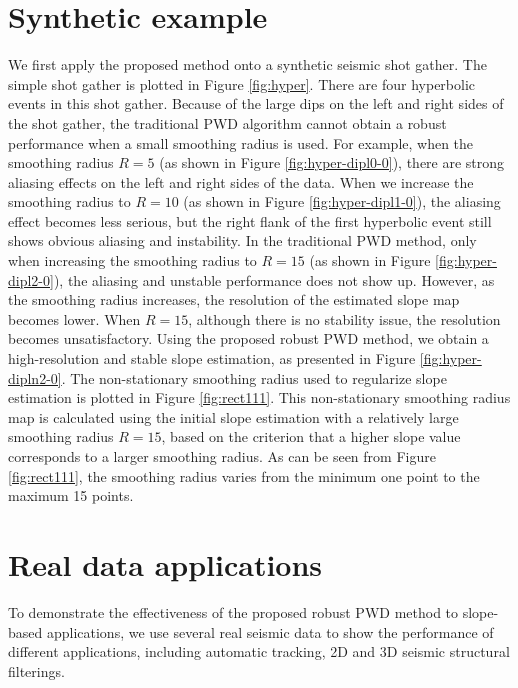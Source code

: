 \section{Synthetic example}
We first apply the proposed method onto a synthetic seismic shot gather. The simple shot gather is plotted in Figure \ref{fig:hyper}. There are four hyperbolic events in this shot gather. Because of the large dips on the left and right sides of the shot gather, the traditional PWD algorithm cannot obtain a robust performance when a small smoothing radius is used. For example, when the smoothing radius $R=5$ (as shown in Figure \ref{fig:hyper-dipl0-0}), there are strong aliasing effects on the left and right sides of the data. When we increase the smoothing radius to $R=10$ (as shown in Figure \ref{fig:hyper-dipl1-0}), the aliasing effect becomes less serious, but the right flank of the first hyperbolic event still shows obvious aliasing and instability. In the traditional PWD method, only when increasing the smoothing radius to $R=15$ (as shown in Figure \ref{fig:hyper-dipl2-0}), the aliasing and unstable performance does not show up. However, as the smoothing radius increases, the resolution of the estimated slope map becomes lower. When $R=15$, although there is no stability issue, the resolution becomes unsatisfactory. Using the proposed robust PWD method, we obtain a high-resolution and stable slope estimation, as presented in Figure \ref{fig:hyper-dipln2-0}. The non-stationary smoothing radius used to regularize slope estimation is plotted in Figure \ref{fig:rect111}. This non-stationary smoothing radius map is calculated using the initial slope estimation with a relatively large smoothing radius $R=15$, based on the criterion that a higher slope value corresponds to a larger smoothing radius. As can be seen from Figure \ref{fig:rect111}, the smoothing radius varies from the minimum one point to the maximum 15 points. 



\section{Real data applications}
To demonstrate the effectiveness of the proposed robust PWD method to slope-based applications, we use several real seismic data to show the performance of different applications, including automatic tracking, 2D and 3D seismic structural filterings.  

